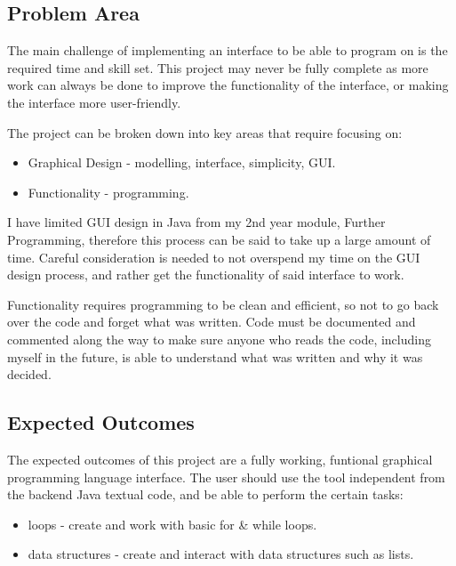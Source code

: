\documentclass[a4paper, 12pt]{article}
\begin{document}
        \subsection{Problem Area}
            The main challenge of implementing an interface to be able to program on is the required 
            time and skill set. This project may never be fully complete as more work can always be 
            done to improve the functionality of the interface, or making the interface more user-friendly.

            The project can be broken down into key areas that require focusing on:
        
            \begin{itemize}
                \item Graphical Design - modelling, interface, simplicity, GUI.
                \item Functionality - programming.
            \end{itemize}

            I have limited GUI design in Java from my 2nd year module, Further Programming, therefore this 
            process can be said to take up a large amount of time. Careful consideration is needed to 
            not overspend my time on the GUI design process, and rather get the functionality of said 
            interface to work.

            Functionality requires programming to be clean and efficient, so not to go back over the code 
            and forget what was written. Code must be documented and commented along the way to make sure 
            anyone who reads the code, including myself in the future, is able to understand what was 
            written and why it was decided.

            \subsection{Expected Outcomes}
            The expected outcomes of this project are a fully working, funtional graphical programming 
            language interface. The user should use the tool independent from the backend Java textual 
            code, and be able to perform the certain tasks:

            \begin{itemize}
                \item loops - create and work with basic for \& while loops.
                \item data structures - create and interact with data structures such as lists.
            \end{itemize}
\end{document}
